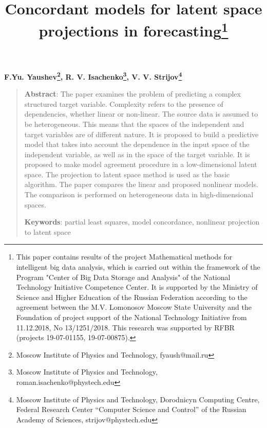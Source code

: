 \documentclass[12pt]{article}
\begin{document}
 
\title{Concordant models for latent space projections in forecasting\thanks{This paper contains results of the project Mathematical methods for intelligent big data analysis, which is carried out within the framework of the Program "Center of Big Data Storage and Analysis" of the National Technology Initiative Competence Center. It is supported by the Ministry of Science and Higher Education of the Russian Federation according to the agreement between the M.V. Lomonosov Moscow State University and the Foundation of project support of the National Technology Initiative from 11.12.2018, No 13/1251/2018. This research was supported by RFBR (projects  19-07-01155, 19-07-00875).}}
\date{}
\maketitle

\begin{center}
\bf
F.Yu. Yaushev\footnote{Moscow Institute of Physics and Technology, fyaush@mail.ru},
R. V. Isachenko\footnote{Moscow Institute of Physics and Technology, roman.isachenko@phystech.edu},
V. V. Strijov\footnote{Moscow Institute of Physics and Technology, Dorodnicyn Computing Centre, Federal Research Center “Computer Science and Control” of the Russian Academy of Sciences, strijov@phystech.edu}
\end{center}

{\centering\begin{quote}
\textbf{Abstract}: 
The paper examines the problem of predicting a complex structured target variable. 
Complexity refers to the presence of dependencies, whether linear or non-linear. 
The source data is assumed to be heterogeneous.
This means that the spaces of the independent and target variables are of different nature. 
It is proposed to build a predictive model that takes into account the dependence in the input space of the independent variable, as well as in the space of the target variable. 
It is proposed to make model agreement procedure in a low-dimensional latent space. 
The projection to latent space method is used as the basic algorithm. 
The paper compares the linear and proposed nonlinear models. 
The comparison is performed on heterogeneous data in high-dimensional spaces.

	
\smallskip
\textbf{Keywords}: partial least squares, model concordance, nonlinear projection to latent space
\end{quote}
}
\end{document}
